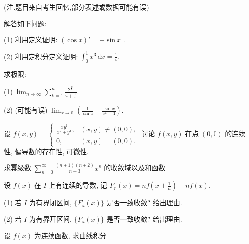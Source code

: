 (注.题目来自考生回忆,部分表述或数据可能有误)\par
解答如下问题:\par
(1) 利用定义证明:  $(\cos x)' = -\sin x$ .\par
(2) 利用定积分定义证明: $\int_{0}^{1} x^{3} \, \mathrm{d}x = \frac{1}{4}$.\par
求极限:\par
(1) $\lim_{n\to \infty}\sum_{k = 1}^{n}\frac{2^{\frac{k}{n}}}{n + \frac{1}{k}}.$\par
(2) (可能有误) $\lim_{x\to 0}\left(\frac{1}{\sin x} -\frac{\sin x}{e^x - 1}\right).$\par
设 $f(x, y) = \begin{cases} \frac{xy^2}{x^2 + y^4}, & (x, y) \neq (0, 0), \\ 0, & (x, y) = (0, 0). \end{cases}$ 讨论 $f(x, y)$ 在点 $(0, 0)$ 的连续性, 偏导数的存在性, 可微性.\par
求幂级数 $\sum_{n=0}^{\infty} \frac{(n+1)(n+2)}{n+3} x^n$ 的收敛域以及和函数.\par
设 $f(x)$ 在 $I$ 上有连续的导数, 记 $F_{n}(x) = nf\left(x + \frac{1}{n}\right) - nf(x)$.\par
(1) 若 $I$ 为有界闭区间, $\{F_n(x)\}$ 是否一致收敛? 给出理由.\par
(2) 若 $I$ 为有界开区间, $\{F_n(x)\}$ 是否一致收敛? 给出理由.\par
\par{}
设 $f(x)$ 为连续函数, 求曲线积分\par
\nopagebreak[4]
